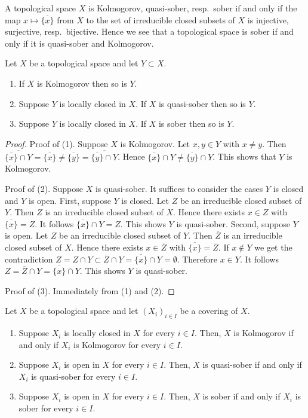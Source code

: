 \noindent
A topological space $X$ is Kolmogorov, quasi-sober, resp.\ sober if and
only if the map $x\mapsto\overline{\{x\}}$ from $X$ to the set of
irreducible closed subsets of $X$ is injective, surjective, resp.\ bijective.
Hence we see that a topological space is sober if and only if it is
quasi-sober and Kolmogorov.

\begin{lemma}
\label{lemma-sober-subspace}
Let $X$ be a topological space and let $Y\subset X$.
\begin{enumerate}
\item If $X$ is Kolmogorov then so is $Y$.
\item Suppose $Y$ is locally closed in $X$. If $X$ is quasi-sober then
so is $Y$.
\item Suppose $Y$ is locally closed in $X$. If $X$ is sober then so is $Y$.
\end{enumerate}
\end{lemma}

\begin{proof}
Proof of (1). Suppose $X$ is Kolmogorov. Let $x,y\in Y$ with $x\neq y$. Then
$\overline{\overline{\{x\}}\cap Y}=\overline{\{x\}}\neq\overline{\{y\}}=
\overline{\overline{\{y\}}\cap Y}$. Hence
$\overline{\{x\}}\cap Y\neq\overline{\{y\}}\cap Y$. This shows that $Y$ is
Kolmogorov.

\medskip\noindent
Proof of (2). Suppose $X$ is quasi-sober. It suffices to consider the
cases $Y$ is closed and $Y$ is open. First, suppose $Y$ is closed. Let
$Z$ be an irreducible closed subset of $Y$. Then $Z$ is an irreducible closed
subset of $X$. Hence there exists $x \in Z$ with $\overline{\{x\}} = Z$. It
follows $\overline{\{x\}} \cap Y = Z$. This shows $Y$ is quasi-sober. Second,
suppose $Y$ is open. Let $Z$ be an irreducible closed subset of $Y$. Then
$\overline{Z}$ is an irreducible closed subset of $X$. Hence there
exists $x \in \overline{Z}$ with $\overline{\{x\}}=\overline{Z}$. If
$x\notin Y$ we get the contradiction
$Z=Z\cap Y\subset\overline{Z}\cap Y=\overline{\{x\}}\cap Y=\emptyset$.
Therefore $x\in Y$. It follows $Z=\overline{Z}\cap Y=\overline{\{x\}}\cap Y$.
This shows $Y$ is quasi-sober.

\medskip\noindent
Proof of (3). Immediately from (1) and (2).
\end{proof}

\begin{lemma}
\label{lemma-sober-local}
Let $X$ be a topological space and let $(X_i)_{i\in I}$ be a covering of $X$.
\begin{enumerate}
\item Suppose $X_i$ is locally closed in $X$ for every $i\in I$. Then, $X$ is
Kolmogorov if and only if $X_i$ is Kolmogorov for every $i\in I$.
\item Suppose $X_i$ is open in $X$ for every $i\in I$. Then, $X$ is
quasi-sober if and only if $X_i$ is quasi-sober for every $i\in I$.
\item Suppose $X_i$ is open in $X$ for every $i\in I$. Then, $X$ is sober if
and  only if $X_i$ is sober for every $i\in I$.
\end{enumerate}
\end{lemma}

